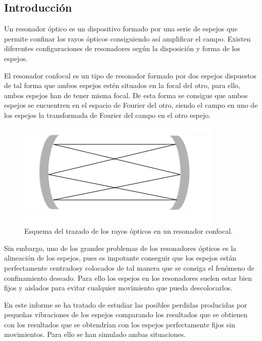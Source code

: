 \documentclass[twoside]{article}
\begin{document}
		\begin{multicols}{2} %

			\section{Introducción} %
								 
				Un resonador óptico es un dispositivo formado por una serie de espejos que permite confinar los rayos ópticos consiguiendo así amplificar el campo. Existen diferentes configuraciones de resonadores según la disposición y forma de los espejos.

				El resonador confocal es un tipo de resonador formado por dos espejos dispuestos de tal forma que ambos espejos estén situados en la focal del otro, para ello, ambos espejos han de tener misma focal. De esta forma se consigue que ambos espejos se encuentren en el espacio de Fourier del otro, siendo el campo en uno de los espejos la transformada de Fourier del campo en el otro espejo.

				\begin{figure}[H]
					\centering
					\includegraphics[scale=0.5]{ResonadorConfocal.png}
					\caption{\label{Img:Resonador}Esquema del trazado de los rayos ópticos en un resonador confocal.}
				\end{figure}

				Sin embargo, uno de los grandes problemas de los resonadores ópticos es la alineación de los espejos, pues es impotante conseguir que los espejos están perfectamente centradosy colocados de tal manera que se consiga el fenómeno de confinamiento deseado. Para ello los espejos en los resonadores suelen estar bien fijos y aislados para evitar cualquier movimiento que pueda descolocarlos.

				En este informe se ha tratado de estudiar las posibles perdidas producidas por pequeñas vibraciones de los espejos comparando los resultados que se obtienen con los resultados que se obtendrían con los espejos perfectamente fijos sin movimientos. Para ello se han simulado ambas situaciones.


\end{multicols}
\end{document}
